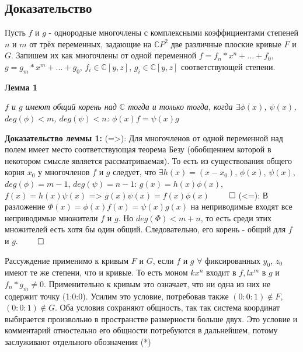 \documentclass[a4paper, 12pt]{article}
\begin{document}
\subsection{Доказательство}
Пусть $f$ и $g$ - однородные многочлены с комплексными коэффициентами степеней $n$ и $m$ от трёх переменных, задающие на $\mathbb{C}P^2$ две различные плоские кривые $F$ и $G$.
Запишем их как многочлены от одной переменной $f = f_n*x^n + ... + f_0$, $g = g_m*x^m + ... + g_0$, $f_i \in \mathbb{C}[y,z]$, $g_i \in \mathbb{C}[y,z]$ соответствующей степени.

\bigskip
\textbf{Лемма 1}

\textit{$f$ и $g$ имеют общий корень над $\mathbb{C}$ тогда и только тогда, когда $\exists \phi(x)$, $\psi(x)$, $deg(\phi) < m$, $deg(\psi) < n$: $\phi(x)f = \psi(x)g$}

\smallskip
\textbf{Доказательство леммы 1:}
\smallskip
(=>): Для многочленов от одной переменной над полем имеет место соответствующая теорема Безу (обобщением которой в некотором смысле является рассматриваемая). То есть из существования общего корня $x_0$ у многочленов $f$ и $g$ следует, что $\exists h(x)=(x-x_0)$, $\phi(x)$, $\psi(x)$, $deg(\phi) = m-1$, $deg(\psi) = n-1$: $g(x)=h(x)\phi(x)$, $f(x)=h(x)\psi(x)$ => $g(x)\psi(x) = f(x)\phi(x)$ $\qed$
\smallskip
(<=): В разложение $\Phi(x) = \phi(x)f(x) = \psi(x)g(x)$ на неприводимые входят все неприводимые множители $f$ и $g$. Но $deg(\Phi) < m + n$, то есть среди этих множителей есть хотя бы один общий. Следовательно, его корень - общий для $f$ и $g$. $\qed$

\bigskip
Рассуждение применимо к кривым $F$ и $G$, если $f$ и $g$ $\forall$ фиксированных $y_0$, $z_0$ имеют те же степени, что и кривые. То есть моном $kx^n$ входит в $f, lx^m$ в $g$ и $f_n*g_m \neq 0$. Применительно к кривым это означает, что ни одна из них не содержит точку (1:0:0). Усилим это условие, потребовав также $(0:0:1) \notin F$, $(0:0:1) \notin G$. Оба условия сохраняют общность, так так система координат выбирается произвольно в пространстве размерности больше двух. Это условие и комментарий отностельно его общности потребуются в дальнейшем, потому заслуживают отдельного обозначения (*) %
\bigskip
\end{document}

